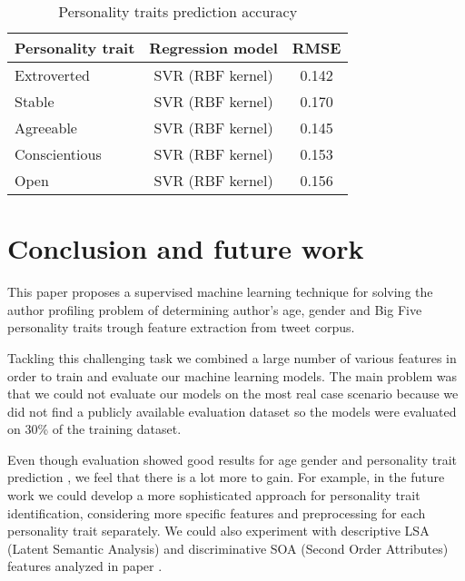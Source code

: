 \documentclass[10pt, a4paper]{article}
\begin{document}
\begin{table}[h]
\vspace{1mm}
\caption{Personality traits prediction accuracy}
\label{tab:narrow-table-4}
\vspace{-6mm}
\begin{center}
\begin{tabular}{lcc}
\midrule
Personality trait & Regression model & RMSE\\
\midrule
 Extroverted & SVR  (RBF kernel) & 0.142 \\
 Stable & SVR (RBF kernel)& 0.170 \\
 Agreeable & SVR  (RBF kernel)& 0.145 \\
 Conscientious & SVR  (RBF kernel)  & 0.153 \\
 Open & SVR  (RBF kernel) & 0.156 \\
\bottomrule
\end{tabular}
\end{center}
\end{table}
\par

\section{Conclusion and future work}

This paper proposes a supervised machine learning technique for solving the author profiling problem of determining author's age, gender and Big Five personality traits trough feature extraction from tweet corpus. 
\par\vspace{1mm}
Tackling this challenging task we combined a large number of various features in order to train and evaluate our machine learning models. The main problem was that we could not evaluate our models on the most real case scenario because we did not find a publicly available evaluation dataset so the models were evaluated on 30\% of the training dataset.
\par\vspace{1mm}
Even though evaluation showed good results for age gender and personality trait prediction  \citep{rangel2015}, we feel that there is a lot more to gain. For example, in the future work we could develop a more sophisticated approach for personality trait identification, considering more specific features and preprocessing for each personality trait separately. We could also experiment with descriptive LSA (Latent Semantic Analysis) and discriminative SOA (Second Order Attributes) features analyzed in paper \citep{escalante2015}.


 
\end{document}
